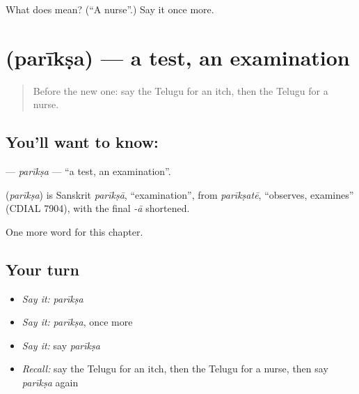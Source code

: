 \begin{tcolorbox}[breakable,colback=teal!4,colframe=teal!35!black,title={Before you move on}]
What does  mean? (\textquotedblleft{}A nurse\textquotedblright{}.) Say it once more.
\end{tcolorbox}
\section[\texorpdfstring{\te{పరీక్ష} (parīkṣa)}{పరీక్ష (parīkṣa)}]{ (parīkṣa) — a test, an examination}

\label{lesson:TE-C209-pariksa}



\begin{quote}
Before the new one: say the Telugu for an itch, then the Telugu for a nurse.
\end{quote}

\subsection*{You'll want to know: }
\textbf{} — \emph{parīkṣa} — \textquotedblleft{}a test, an examination\textquotedblright{}.

\begin{cousinweb}
\textbf{} (\emph{parīkṣa}) is Sanskrit \emph{parīkṣā}, \textquotedblleft{}examination\textquotedblright{}, from \emph{parīkṣatē}, \textquotedblleft{}observes, examines\textquotedblright{} (CDIAL 7904), with the final \emph{-ā} shortened.
\end{cousinweb}

\begin{grammarlens}[title={What you've built}]
One more word for this chapter.
\end{grammarlens}

\subsection*{Your turn}
\begin{itemize}
\raggedright
  \item \emph{Say it:} \emph{parīkṣa}
  \item \emph{Say it:} \emph{parīkṣa}, once more
  \item \emph{Say it:} say \emph{parīkṣa}
  \item \emph{Recall:} say the Telugu for an itch, then the Telugu for a nurse, then say \emph{parīkṣa} again
\end{itemize}

